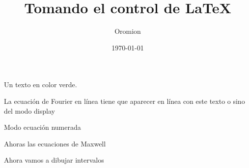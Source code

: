 \documentclass{article}
\title{Tomando el control de \LaTeX{}}
\author{Oromion}
\date{\today}
\begin{document}
\maketitle

\textcolor{myGreen}{Un texto en color verde.}

La ecuación de Fourier en línea  tiene que aparecer en línea con este texto o sino del modo display \Fourier[disp]

Modo ecuación numerada \Fourier[eq]

\cuadratica{}

\Fourier[eq]

Ahoras las ecuaciones de Maxwell

\textcolor{myBlue}{\Maxwell{}}

\adrenalina{}

Ahora vamos a dibujar intervalos

\end{document}
